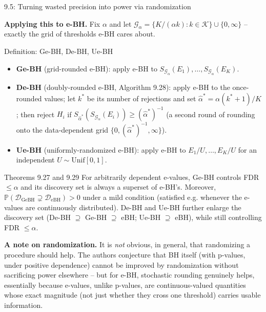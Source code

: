 \documentclass[aspectratio=169,10pt]{beamer}
\newcommand{\Kc}{\mathcal{K}}
\begin{document}
\begin{frame}[allowframebreaks]{9.5: Turning wasted precision into power via randomization}
\framebreak

\textbf{Applying this to e-BH.} Fix $\alpha$ and let $\mathcal{G}_\alpha = \{K/(\alpha k) : k\in\Kc\}\cup\{0,\infty\}$ -- exactly the grid of thresholds e-BH cares about.

\begin{block}{Definition: Ge-BH, De-BH, Ue-BH}
\begin{itemize}
\item \textbf{Ge-BH} (grid-rounded e-BH): apply e-BH to $S_{\mathcal{G}_\alpha}(E_1),\dots,S_{\mathcal{G}_\alpha}(E_K)$.
\item \textbf{De-BH} (doubly-rounded e-BH, Algorithm 9.28): apply e-BH to the once-rounded values; let $k^\ast$ be its number of rejections and set $\hat\alpha^\ast = \alpha(k^\ast+1)/K$; then reject $H_i$ if $S_{\hat\alpha^{\ast}}(S_{\mathcal{G}_\alpha}(E_i)) \ge (\hat\alpha^\ast)^{-1}$ (a second round of rounding onto the data-dependent grid $\{0,(\hat\alpha^\ast)^{-1},\infty\}$).
\item \textbf{Ue-BH} (uniformly-randomized e-BH): apply e-BH to $E_1/U,\dots,E_K/U$ for an independent $U\sim\text{Unif}[0,1]$.
\end{itemize}
\end{block}

\framebreak

\begin{block}{Theorems 9.27 and 9.29}
For arbitrarily dependent e-values, Ge-BH controls FDR $\le \alpha$ and its discovery set is always a superset of e-BH's. Moreover, $\mathbb{P}(\mathcal{D}_{\text{GeBH}} \supsetneq \mathcal{D}_{\text{eBH}}) > 0$ under a mild condition (satisfied e.g. whenever the e-values are continuously distributed). De-BH and Ue-BH further enlarge the discovery set (De-BH $\supseteq$ Ge-BH $\supseteq$ eBH; Ue-BH $\supseteq$ eBH), while still controlling FDR $\le \alpha$.
\end{block}

\textbf{A note on randomization.} It is \emph{not} obvious, in general, that randomizing a procedure should help. The authors conjecture that BH itself (with p-values, under positive dependence) cannot be improved by randomization without sacrificing power elsewhere -- but for e-BH, stochastic rounding genuinely helps, essentially because e-values, unlike p-values, are continuous-valued quantities whose exact magnitude (not just whether they cross one threshold) carries usable information.

\end{frame}
\end{document}
